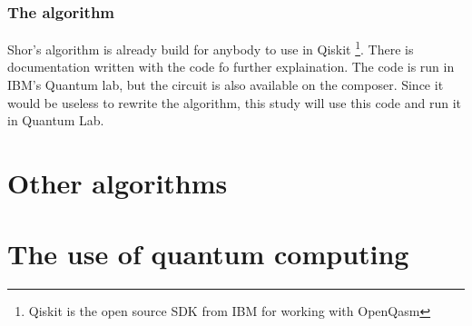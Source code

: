 \subsubsection{The algorithm}

Shor's algorithm is already build for anybody to use in Qiskit \footnote{Qiskit is the open source SDK from IBM for working with OpenQasm}. There is documentation written with the code fo further explaination.
The code is run in IBM's Quantum lab, but the circuit is also available on the composer. Since it would be useless to rewrite the algorithm, this study will use this code and run it in Quantum Lab.


\section{Other algorithms}
\label{sec:Other algorithms}
\section{The use of quantum computing}